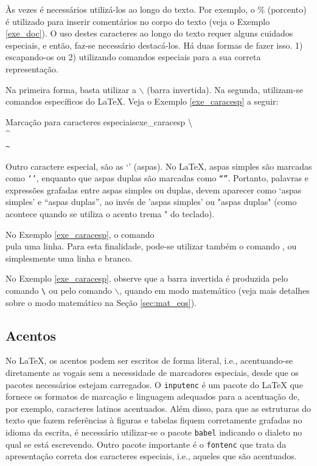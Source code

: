 Às vezes é necessários utilizá-los ao longo do texto. Por exemplo, o \% (porcento) é utilizado para inserir comentários no corpo do texto (veja o Exemplo \ref{exe_doc}). O uso destes caracteres ao longo do texto requer alguns cuidados especiais, e então, faz-se necessário destacá-los. Há duas formas de fazer isso. 1) escapando-os ou 2) utilizando comandos especiais para a sua correta representação.

Na primeira forma, basta utilizar a {\tt $\backslash$} (barra invertida). Na segunda, utilizam-se comandos específicos do \LaTeX{}. Veja o Exemplo \ref{exe_caracesp} a seguir:

\begin{texexptitled}[breakable,center lower,enhanced,middle=2mm,listing side text]{Marcação para caracteres especiais}{exe_caracesp}
\textbackslash
\\
\^{}
\\
\texttt{\~{}}
\end{texexptitled}

Outro caractere especial, são as `' (aspas). No \LaTeX{}, aspas simples são marcadas como \texttt{`'}, enquanto que aspas duplas são marcadas como \texttt{``''}. Portanto, palavras e expressões grafadas entre aspas simples ou duplas, devem aparecer como `aspas simples' e ``aspas duplas'', ao invés de 'aspas simples' ou "aspas duplas"  (como acontece quando se utiliza o acento trema "  do teclado).

\begin{marker}
  No Exemplo \ref{exe_caracesp}, o comando \texttt{\\} pula uma linha. Para esta finalidade, pode-se utilizar também o comando \texttt{\newline}, ou simplesmente uma linha e branco.
\end{marker}

No Exemplo \ref{exe_caracesp}, observe que a barra invertida é produzida pelo comando \texttt{\textbackslash} ou pelo comando \texttt{$\backslash$}, quando em modo matemático (veja mais detalhes sobre o modo matemático na Seção \ref{sec:mat_eqs}).

\subsection{Acentos}
\label{sec:acentos}

No \LaTeX{}, os acentos podem ser escritos de forma literal, i.e., acentuando-se diretamente as vogais sem a necessidade de marcadores especiais, desde que os pacotes necessários estejam carregados. O {\tt inputenc} é um pacote do \LaTeX{} que fornece os formatos de marcação e linguagem adequados para a acentuação de, por exemplo, caracteres latinos acentuados. Além disso, para que as estruturas do texto que fazem referências à figuras e tabelas fiquem corretamente grafadas no idioma da escrita, é necessário utilizar-se o pacote {\tt babel} indicando o dialeto no qual se está escrevendo. Outro pacote importante é o {\tt fontenc} que trata da apresentação correta dos caracteres especiais, i.e., aqueles que são acentuados.

